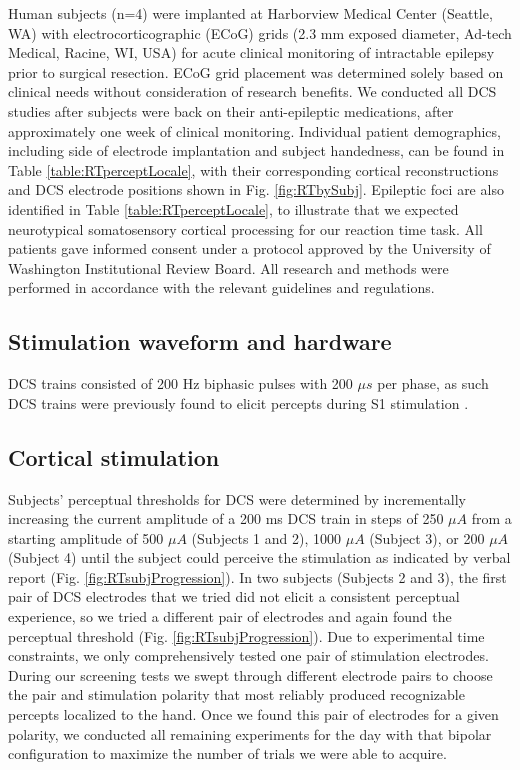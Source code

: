 Human subjects (n=4) were implanted at Harborview Medical Center (Seattle, WA) with electrocorticographic (ECoG) grids (2.3 mm exposed diameter, Ad-tech Medical, Racine, WI, USA) for acute clinical monitoring of intractable epilepsy prior to surgical resection. ECoG grid placement was determined solely based on clinical needs without consideration of research benefits. We conducted all DCS studies after subjects were back on their anti-epileptic medications, after approximately one week of clinical monitoring. Individual patient demographics, including side of electrode implantation and subject handedness, can be found in Table \ref{table:RTperceptLocale}, with their corresponding cortical reconstructions and DCS electrode positions shown in Fig. \ref{fig:RTbySubj}. Epileptic foci are also identified in Table \ref{table:RTperceptLocale}, to illustrate that we expected neurotypical somatosensory cortical processing for our reaction time task. All patients gave informed consent under a protocol approved by the University of Washington Institutional Review Board. All research and methods were performed in accordance with the relevant guidelines and regulations.
 
 
 \subsection{Stimulation waveform and hardware}
 
 
  DCS trains consisted of 200 Hz biphasic pulses with 200 $ \mu s $ per phase, as such DCS trains were previously found to elicit percepts during S1 stimulation \cite{Cronin2016a}.
 
 \subsection{Cortical stimulation}
 
 Subjects’ perceptual thresholds for DCS were determined by incrementally increasing the current amplitude of a 200 ms DCS train in steps of 250 $ \mu A  $ from a starting amplitude of 500  $ \mu A  $ (Subjects 1 and 2), 1000 $ \mu A  $  (Subject 3), or 200 $ \mu A  $ (Subject 4) until the subject could perceive the stimulation as indicated by verbal report (Fig. \ref{fig:RTsubjProgression}). In two subjects (Subjects 2 and 3), the first pair of DCS electrodes that we tried did not elicit a consistent perceptual experience, so we tried a different pair of electrodes and again found the perceptual threshold (Fig. \ref{fig:RTsubjProgression}). Due to experimental time constraints, we only comprehensively tested one pair of stimulation electrodes. During our screening tests we swept through different electrode pairs to choose the pair and stimulation polarity that most reliably produced recognizable percepts localized to the hand. Once we found this pair of electrodes for a given polarity, we conducted all remaining experiments for the day with that bipolar configuration to maximize the number of trials we were able to acquire. 
 
